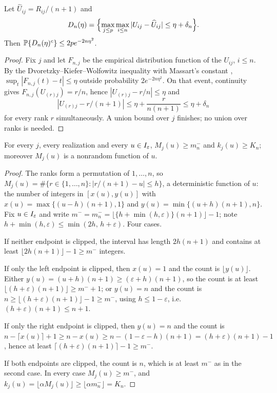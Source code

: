 \begin{lemma}\label{lem:app-dkw}
Let $\widehat U_{ij}=R_{ij}/(n+1)$ and
\[
 D_n(\eta)=\Bigl\{\max_{j\le p}\max_{i\le n}
 |U_{ij}-\widehat U_{ij}|\le\eta+\delta_n\Bigr\}.
\]
Then $\mathbb P\{D_n(\eta)^c\}\le2pe^{-2n\eta^2}$.
\end{lemma}

\begin{proof}
Fix $j$ and let $F_{n,j}$ be the empirical distribution function of the
$U_{ij}$, $i\le n$.  By the Dvoretzky--Kiefer--Wolfowitz inequality with
Massart's constant \citep{massart1990},
$\sup_t|F_{n,j}(t)-t|\le\eta$ outside probability
$2e^{-2n\eta^2}$.  On that event, continuity gives
$F_{n,j}(U_{(r)j})=r/n$, hence $|U_{(r)j}-r/n|\le\eta$ and
\[
 |U_{(r)j}-r/(n+1)|\le\eta+\frac{r}{n(n+1)}\le\eta+\delta_n
\]
for every rank $r$ simultaneously.  A union bound over $j$ finishes; no
union over ranks is needed.
\end{proof}

\begin{lemma}\label{lem:app-counts}
For every $j$, every realization and every $u\in I_\varepsilon$,
$M_j(u)\ge m_n^-$ and $k_j(u)\ge K_n$; moreover $M_j(u)$ is a nonrandom
function of $u$.
\end{lemma}

\begin{proof}
The ranks form a permutation of $1,\ldots,n$, so
$M_j(u)=\#\{r\in\{1,\ldots,n\}:|r/(n+1)-u|\le h\}$, a deterministic
function of $u$: the number of integers in
$[x(u),y(u)]$ with $x(u)=\max\{(u-h)(n+1),1\}$ and
$y(u)=\min\{(u+h)(n+1),n\}$.  Fix $u\in I_\varepsilon$ and write
$m^-=m_n^-=\lfloor\{h+\min(h,\varepsilon)\}(n+1)\rfloor-1$; note
$h+\min(h,\varepsilon)\le\min(2h,\,h+\varepsilon)$.  Four cases.

If neither endpoint is clipped, the interval has length $2h(n+1)$ and
contains at least $\lfloor2h(n+1)\rfloor-1\ge m^-$ integers.

If only the left endpoint is clipped, then $x(u)=1$ and the count is
$\lfloor y(u)\rfloor$.  Either $y(u)=(u+h)(n+1)\ge(\varepsilon+h)(n+1)$,
so the count is at least
$\lfloor(h+\varepsilon)(n+1)\rfloor\ge m^-+1$; or $y(u)=n$ and the count
is $n\ge\lfloor(h+\varepsilon)(n+1)\rfloor-1\ge m^-$, using
$h\le1-\varepsilon$, i.e.\ $(h+\varepsilon)(n+1)\le n+1$.

If only the right endpoint is clipped, then $y(u)=n$ and the count is
$n-\lceil x(u)\rceil+1\ge n-x(u)\ge n-(1-\varepsilon-h)(n+1)
=(h+\varepsilon)(n+1)-1$, hence at least
$\lceil(h+\varepsilon)(n+1)\rceil-1\ge m^-$.

If both endpoints are clipped, the count is $n$, which is at least
$m^-$ as in the second case.  In every case $M_j(u)\ge m^-$, and
$k_j(u)=\lfloor\alpha M_j(u)\rfloor\ge\lfloor\alpha m_n^-\rfloor=K_n$.
\end{proof}

